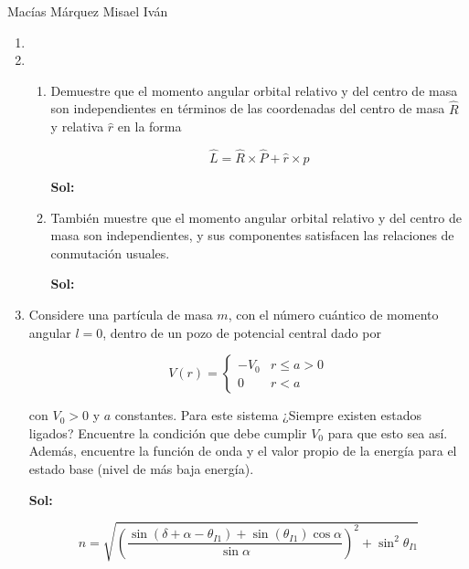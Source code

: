 \documentclass[12pt,a4paper]{article}
\begin{document}
Macías Márquez Misael Iván

\begin{enumerate}


\item






\item \begin{enumerate}
    \item Demuestre que el momento angular orbital relativo y del centro de masa son independientes en términos de las coordenadas del centro de masa $\hat{R}$ y relativa $\hat{r}$ en la forma
    
    \begin{equation*}
        \hat{L} = \hat{R} \times \hat{P} + \hat{r} \times \hat{p}
    \end{equation*}
    
    \textbf{Sol:}
    
    \item También muestre que el momento angular orbital relativo y del centro de masa son independientes, y sus componentes satisfacen las relaciones de conmutación usuales.
    
    \textbf{Sol:}
    
\end{enumerate}






\item Considere una partícula de masa $m$, con el número cuántico de momento angular $l = 0$, dentro de un pozo de potencial central dado por

\begin{equation*}
    V(r) = \left\{\begin{array}{cc}
        -V_0 & r \leq a > 0  \\
         0 & r < a
    \end{array} \right.
\end{equation*}

con $V_0 > 0$ y $a$ constantes. Para este sistema ¿Siempre existen estados ligados? Encuentre la condición que debe cumplir $V_0$ para que esto sea así. Además, encuentre la función de onda y el valor propio de la energía para el estado base (nivel de más baja energía).

\textbf{Sol:}

\begin{equation*}
    n= \sqrt{\left(\frac{\sin{(\delta + \alpha - \theta_{I1})}+\sin{(\theta_{I1})}\cos{\alpha}}{\sin{\alpha}}\right)^{2} + \sin^2{\theta_{I1}}}
\end{equation*}
    
    
\end{enumerate}
\end{document}
